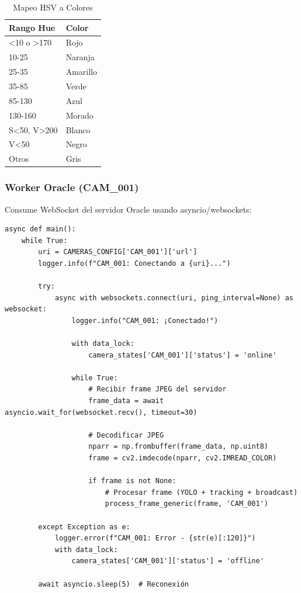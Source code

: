 \documentclass[12pt,a4paper]{article}
\begin{document}
\begin{table}[H]
\centering
\begin{tabular}{|l|l|}
\hline
\textbf{Rango Hue} & \textbf{Color} \\
\hline
\textless 10 o \textgreater 170 & Rojo \\
10-25 & Naranja \\
25-35 & Amarillo \\
35-85 & Verde \\
85-130 & Azul \\
130-160 & Morado \\
S\textless50, V\textgreater200 & Blanco \\
V\textless50 & Negro \\
Otros & Gris \\
\hline
\end{tabular}
\caption{Mapeo HSV a Colores}
\end{table}

\subsubsection{Worker Oracle (CAM\_001)}

Consume WebSocket del servidor Oracle usando asyncio/websockets:

\begin{lstlisting}[caption={Worker Oracle - Conexión WebSocket}, style=pythonstyle, label=lst:worker-oracle]
async def main():
    while True:
        uri = CAMERAS_CONFIG['CAM_001']['url']
        logger.info(f"CAM_001: Conectando a {uri}...")
        
        try:
            async with websockets.connect(uri, ping_interval=None) as websocket:
                logger.info("CAM_001: ¡Conectado!")
                
                with data_lock:
                    camera_states['CAM_001']['status'] = 'online'
                
                while True:
                    # Recibir frame JPEG del servidor
                    frame_data = await asyncio.wait_for(websocket.recv(), timeout=30)
                    
                    # Decodificar JPEG
                    nparr = np.frombuffer(frame_data, np.uint8)
                    frame = cv2.imdecode(nparr, cv2.IMREAD_COLOR)
                    
                    if frame is not None:
                        # Procesar frame (YOLO + tracking + broadcast)
                        process_frame_generic(frame, 'CAM_001')
                        
        except Exception as e:
            logger.error(f"CAM_001: Error - {str(e)[:120]}")
            with data_lock:
                camera_states['CAM_001']['status'] = 'offline'
        
        await asyncio.sleep(5)  # Reconexión
\end{lstlisting}
\end{document}
